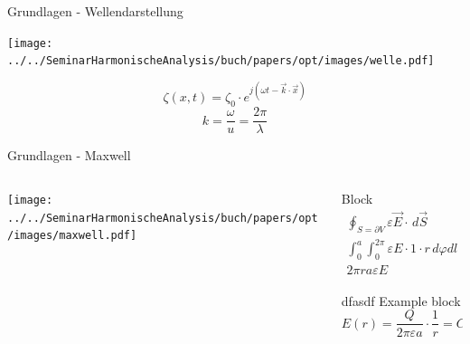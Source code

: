 \begin{frame}{Grundlagen - Wellendarstellung}
    \begin{center}
        \texttt{[image: ../../SeminarHarmonischeAnalysis/buch/papers/opt/images/welle.pdf]}
    \end{center}
    \begin{equation*}
        \zeta(x, t)
        =
        \zeta_0 \cdot e^{j(\omega t - \vec{k}\cdot\vec{x})}
    \end{equation*}
    \begin{equation*}
        k
        =
        \frac{\omega}{u}
        =
        \frac{2 \pi}{\lambda}
    \end{equation*}
\end{frame}

\begin{frame}{Grundlagen - Maxwell}
    \begin{columns}
        \begin{column}{0.5\textwidth}
            \begin{center}
                \texttt{[image: ../../SeminarHarmonischeAnalysis/buch/papers/opt/images/maxwell.pdf]}
            \end{center}
        \end{column}

        \begin{column}{0.5\textwidth}
            \pause
            \begin{block}{Block}
                \begin{align*}
                    \oint_{S=\partial V} \varepsilon\vec{E} \cdot\, d\vec{S}
                    &=
                    \int_{V}\rho\, dV
                    \\
                    \int_{0}^{a}\int_{0}^{2\pi} \varepsilon E\cdot 1 \cdot r\, d\varphi dl
                    &=
                    Q
                    \\
                    2\pi ra\varepsilon E
                    &=
                    Q
                \end{align*}
            \end{block}
            \pause
            \begin{exampleblock}{dfasdf Example block}
                \begin{equation*}
                    E(r)
                    =
                    \frac{Q}{2\pi\varepsilon a} \cdot \frac{1}{r}
                    =
                    C \cdot \frac{1}{r}
                \end{equation*}
            \end{exampleblock}
        \end{column}
    \end{columns}
\end{frame}

